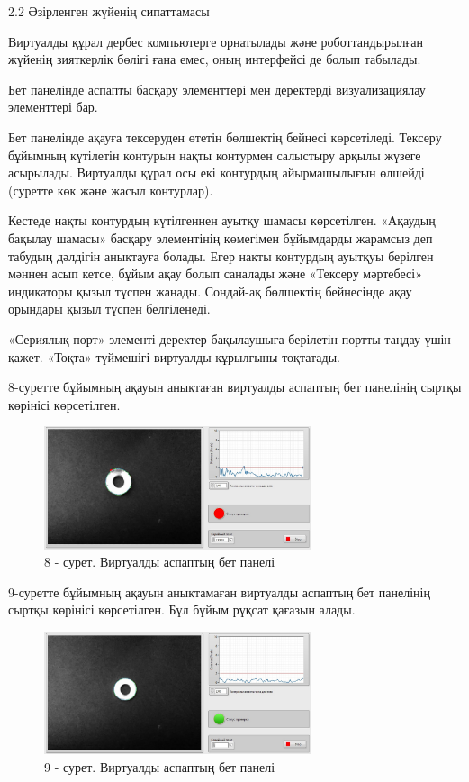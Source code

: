 \begin{multicols}{2}
2.2 Әзірленген жүйенің сипаттамасы

Виртуалды құрал дербес компьютерге орнатылады және роботтандырылған
жүйенің зияткерлік бөлігі ғана емес, оның интерфейсі де болып табылады.

Бет панелінде аспапты басқару элементтері мен деректерді визуализациялау
элементтері бар.

Бет панелінде ақауға тексеруден өтетін бөлшектің бейнесі көрсетіледі.
Тексеру бұйымның күтілетін контурын нақты контурмен салыстыру арқылы
жүзеге асырылады. Виртуалды құрал осы екі контурдың айырмашылығын
өлшейді (суретте көк және жасыл контурлар).

Кестеде нақты контурдың күтілгеннен ауытқу шамасы көрсетілген. «Ақаудың
бақылау шамасы» басқару элементінің көмегімен бұйымдарды жарамсыз деп
табудың дәлдігін анықтауға болады. Егер нақты контурдың ауытқуы берілген
мәннен асып кетсе, бұйым ақау болып саналады және «Тексеру мәртебесі»
индикаторы қызыл түспен жанады. Сондай-ақ бөлшектің бейнесінде ақау
орындары қызыл түспен белгіленеді.

«Сериялық порт» элементі деректер бақылаушыға берілетін портты таңдау
үшін қажет. «Тоқта» түймешігі виртуалды құрылғыны тоқтатады.

8-суретте бұйымның ақауын анықтаған виртуалды аспаптың бет панелінің
сыртқы көрінісі көрсетілген.
\end{multicols}

\begin{figure}[H]
	\centering
	\includegraphics[width=0.7\textwidth]{media/ict2/image176}
	\caption*{8 - сурет. Виртуалды аспаптың бет панелі}
\end{figure}

9-суретте бұйымның ақауын анықтамаған виртуалды аспаптың бет панелінің
сыртқы көрінісі көрсетілген. Бұл бұйым рұқсат қағазын алады.

\begin{figure}[H]
	\centering
	\includegraphics[width=0.7\textwidth]{media/ict2/image177}
	\caption*{9 - сурет. Виртуалды аспаптың бет панелі}
\end{figure}

